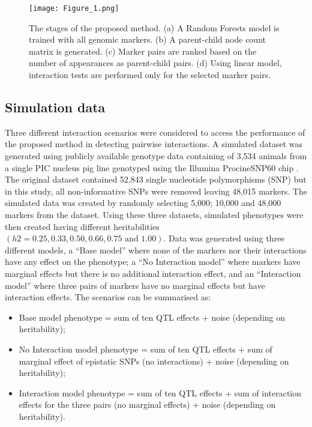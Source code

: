 \documentclass[preprint,12pt,3p]{elsarticle}
\begin{document}
\begin{figure}[thbp]
  \begin{center}
    \centering
    \texttt{[image: Figure\_1.png]}
    \caption{The stages of the proposed method. (a) A Random Forests model is trained with all genomic markers. (b) A
      parent-child node count matrix is generated. (c) Marker pairs are ranked based on the number of appearances as
      parent-child pairs. (d) Using linear model, interaction tests are performed only for the selected marker pairs. }
    \label{figure:RF_Method} 
  \end{center}
\end{figure}

\subsection{Simulation data}

Three different interaction scenarios were considered to access the performance of the proposed method in detecting
pairwise interactions.  A simulated dataset was generated using publicly available genotype data containing of 3,534
animals from a single PIC nucleus pig line genotyped using the Illumina ProcineSNP60 chip \cite[]{clevelandCommonDatasetGenomic2012}. The
original dataset contained 52,843 single nucleotide polymorphisms (SNP) but in this study, all non-informative SNPs were
removed leaving 48,015 markers.  The simulated data was created by randomly selecting 5,000; 10,000 and 48,000 markers
from the dataset.  Using these three datasets, simulated phenotypes were then created having different heritabilities
$(h2 = 0.25, 0.33, 0.50, 0.66, 0.75 \textrm{ and } 1.00)$. Data was generated using three different models, a ``Base model'' where none
of the markers nor their interactions have any effect on the phenotype; a ``No Interaction model'' where markers have
marginal effects but there is no additional interaction effect, and an ``Interaction model'' where three pairs of markers have no marginal effects but have interaction
effects. The scenarios can be summarised as:
\begin{itemize}
\item  Base model phenotype = sum of ten QTL effects + noise (depending on heritability);
\item No Interaction model phenotype = sum of ten QTL effects + sum of marginal effect of epistatic SNPs (no interactions) + noise (depending on heritability);
\item  Interaction model phenotype = sum of ten QTL effects + sum of interaction effects for the three pairs (no   marginal effects) + noise (depending on heritability).
\end{itemize}
\end{document}
